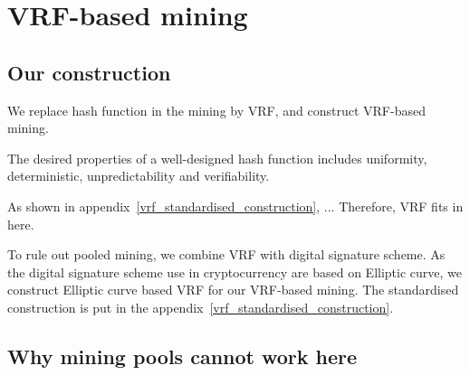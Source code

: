 \section{VRF-based mining}

\subsection{Our construction}

We replace hash function in the mining by VRF, and construct VRF-based mining.

The desired properties of a well-designed hash function includes uniformity, deterministic, unpredictability and verifiability.


As shown in appendix~\ref{vrf_standardised_construction}, ...
Therefore, VRF fits in here.

To rule out pooled mining, we combine VRF with digital signature scheme.
As the digital signature scheme use in cryptocurrency are based on Elliptic curve, we construct Elliptic curve based VRF for our VRF-based mining.
The standardised construction is put in the appendix~\ref{vrf_standardised_construction}.

\subsection{Why mining pools cannot work here}



